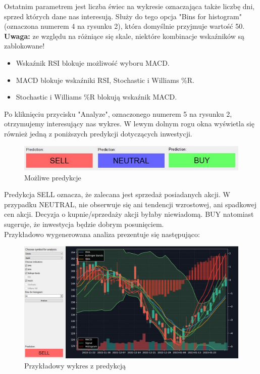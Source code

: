 \documentclass[12pt]{article}
\begin{document}
	Ostatnim parametrem jest liczba świec na wykresie oznaczająca także liczbę dni, sprzed których dane nas interesują. Służy do tego opcja "Bins for histogram" (oznaczona numerem 4 na rysunku 2), która domyślnie przyjmuje wartość 50.\\
	
	\textbf{Uwaga:} ze względu na różniące się skale, niektóre kombinacje wskaźników są zablokowane!
	
	\begin{itemize}
		\item Wskaźnik RSI blokuje możliwość wyboru MACD.
		\item MACD blokuje wskaźniki RSI, Stochastic i Williams \%R.
		\item Stochastic i Williams \%R blokują wskaźnik MACD.	
	\end{itemize}
	
	Po kliknięciu przycisku "Analyze", oznaczonego numerem 5 na rysunku 2, otrzymujemy interesujący nas wykres. W lewym dolnym rogu okna wyświetla się również jedną z poniższych predykcji dotyczących inwestycji. 
	
	\begin{figure}[H]
		\centering
		\includegraphics[scale=0.5]{pics/predykcje.jpg}
		\caption{Możliwe predykcje} 
	\end{figure}
	
	Predykcja SELL oznacza, że zalecana jest sprzedaż posiadanych akcji. W przypadku NEUTRAL, nie obserwuje się ani tendencji wzrostowej, ani spadkowej cen akcji. Decyzja o kupnie/sprzedaży akcji byłaby niewiadomą. BUY natomiast sugeruje, że inwestycja będzie dobrym posunięciem.\\

\newpage
	Przykładowo wygenerowana analiza prezentuje się następująco:
	
	\begin{figure}[H]
		\centering
		\includegraphics[scale=0.4]{pics/wykres.jpg}
		\caption{Przykładowy wykres z predykcją} 
	\end{figure}
\end{document}
